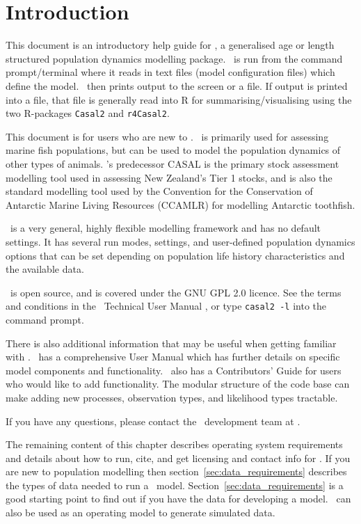 \section{Introduction}\label{sec:introduction}

This document is an introductory help guide for \CNAME, a generalised age or length structured population dynamics modelling package. \CNAME\ is run from the command prompt/terminal where it reads in text files (model configuration files) which define the model. \CNAME\ then prints output to the screen or a file. If output is printed into a file, that file is generally read into R for summarising/visualising using the two R-packages \texttt{Casal2} and \texttt{r4Casal2}.

This document is for users who are new to \CNAME. \CNAME\ is primarily used for assessing marine fish populations, but can be used to model the population dynamics of other types of animals. \CNAME's predecessor CASAL is the primary stock assessment modelling tool used in assessing New Zealand's Tier 1 stocks, and is also the standard modelling tool used by the Convention for the Conservation of Antarctic Marine Living Resources (CCAMLR) for modelling Antarctic toothfish. 

\CNAME\ is a very general, highly flexible modelling framework and has no default settings. It has several run modes, settings, and user-defined population dynamics options that can be set depending on population life history characteristics and the available data.

\CNAME\ is open source, and is covered under the GNU GPL 2.0 licence. See the terms and conditions in the \CNAME\ Technical User Manual \citep{CASAL2}, or type \texttt{casal2 -l} into the command prompt.

There is also additional information that may be useful when getting familiar with \CNAME. \CNAME\ has a comprehensive User Manual \citep{CASAL2} which has further details on specific model components and functionality. \CNAME\ also has a Contributors' Guide for users who would like to add functionality. The modular structure of the code base can make adding new processes, observation types, and likelihood types tractable.

If you have any questions, please contact the \CNAME\ development team at \email.

The remaining content of this chapter describes operating system requirements and details about how to run, cite, and get licensing and contact info for \CNAME.  If you are new to population modelling then section~\ref{sec:data_requirements} describes the types of data needed to run a \CNAME\ model. Section~\ref{sec:data_requirements} is a good starting point to find out if you have the data for developing a model. \CNAME\ can also be used as an operating model to generate simulated data.
 
